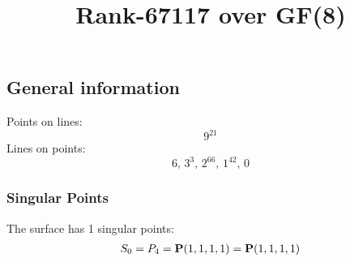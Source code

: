 \documentclass{article}
\newcommand\setTBstruts{\def\T{\rule{0pt}{2.6ex}}%
\def\B{\rule[-1.2ex]{0pt}{0pt}}}
\newcommand{\bP}{{\bf P}}
\begin{document}
 
\setTBstruts



{\allowdisplaybreaks%






\title{Rank-67117 over GF(8)}
\author{}%
\maketitle%
%
{}



\subsection*{General information}
Points on lines:
$$
9^{21}$$
Lines on points:
$$
6,\,3^3,\,2^{66},\,1^{42},\,0$$
\subsubsection*{Singular Points}
The surface has 1 singular points:\\
\begin{align*}
S_{0} &= P_{4}=\bP(1, 1, 1, 1) = \bP(1, 1, 1, 1)\\
\end{align*}
}
\end{document}

